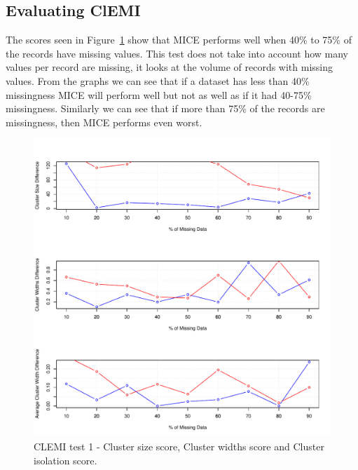 \documentclass[conference,compsoc]{IEEEtran}
\begin{document}
	\subsection{Evaluating ClEMI} %
	\label{sub:evaluating_clemi}
	The scores seen in Figure~\ref{fig:clemi-limit} show that MICE performs well when 40\% to 75\% of the records have missing values. This test does not take into account how many values per record are missing, it looks at the volume of records with missing values. From the graphs we can see that if a dataset has less than 40\% missingness MICE will perform well but not as well as if it had 40-75\% missingness. Similarly we can see that if more than 75\% of the records are missingness, then MICE performs even worst.
	\\
	\begin{figure}[!ht]
		\centering
		\includegraphics[width=\textwidth]{forestFires}
		\caption{CLEMI test 1 - Cluster size score, Cluster widths score and Cluster isolation score. }
		\label{fig:clemi-limit}
	\end{figure}	
\end{document}
